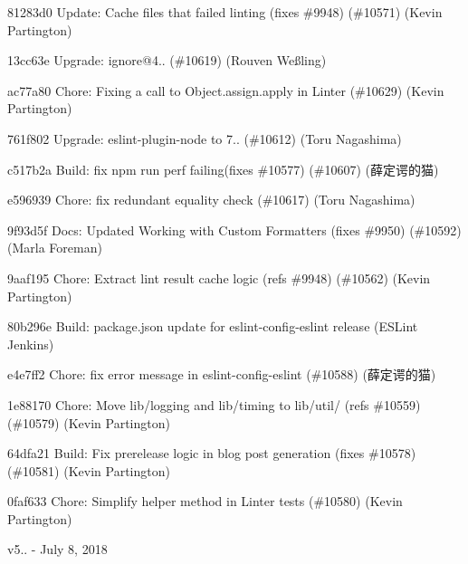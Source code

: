 \begin{DoxyItemize}
\item 81283d0 Update\+: Cache files that failed linting (fixes \#9948) (\#10571) (Kevin Partington)
\item 13cc63e Upgrade\+: ignore@4.. (\#10619) (Rouven Weßling)
\item ac77a80 Chore\+: Fixing a call to Object.\+assign.\+apply in Linter (\#10629) (Kevin Partington)
\item 761f802 Upgrade\+: eslint-\/plugin-\/node to 7.. (\#10612) (Toru Nagashima)
\item c517b2a Build\+: fix npm run perf failing(fixes \#10577) (\#10607) (薛定谔的猫)
\item e596939 Chore\+: fix redundant equality check (\#10617) (Toru Nagashima)
\item 9f93d5f Docs\+: Updated Working with Custom Formatters (fixes \#9950) (\#10592) (Marla Foreman)
\item 9aaf195 Chore\+: Extract lint result cache logic (refs \#9948) (\#10562) (Kevin Partington)
\item 80b296e Build\+: package.\+json update for eslint-\/config-\/eslint release (ESLint Jenkins)
\item e4e7ff2 Chore\+: fix error message in eslint-\/config-\/eslint (\#10588) (薛定谔的猫)
\item 1e88170 Chore\+: Move lib/logging and lib/timing to lib/util/ (refs \#10559) (\#10579) (Kevin Partington)
\item 64dfa21 Build\+: Fix prerelease logic in blog post generation (fixes \#10578) (\#10581) (Kevin Partington)
\item 0faf633 Chore\+: Simplify helper method in Linter tests (\#10580) (Kevin Partington)
\end{DoxyItemize}

v5.. -\/ July 8, 2018


